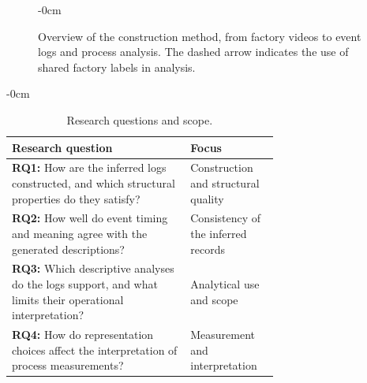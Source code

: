 \begin{figure}[!b]\begin{adjustwidth}{-\extralength}{0cm}\centering
{}
\caption{Overview of the construction method, from factory videos to event logs and process analysis. The dashed arrow indicates the use of shared factory labels in analysis.}
\label{fig:dependency}\end{adjustwidth}\end{figure}

\begin{nextpagetopfloat}
\begin{table}[!t]\begin{adjustwidth}{-\extralength}{0cm}
\caption{Research questions and scope.}
\label{tab:rq}\footnotesize
\begin{tabularx}{\linewidth}{@{}p{0.67\linewidth}L@{}}\toprule
Research question & Focus \\\midrule
\textbf{RQ1:} How are the inferred logs constructed, and which structural properties do they satisfy? & Construction and structural quality \\
\textbf{RQ2:} How well do event timing and meaning agree with the generated descriptions? & Consistency of the inferred records \\
\textbf{RQ3:} Which descriptive analyses do the logs support, and what limits their operational interpretation? & Analytical use and scope \\
\textbf{RQ4:} How do representation choices affect the interpretation of process measurements? & Measurement and interpretation \\
\bottomrule\end{tabularx}
\end{adjustwidth}\end{table}
\end{nextpagetopfloat}

